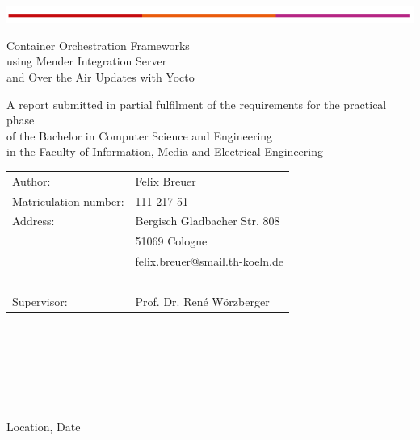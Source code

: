 \begin{titlepage}
\begin{flushleft}
	\vspace*{-1cm}
	\includegraphics[scale=1]{images/th-bar.png}\\
	\vspace*{1cm}
\end{flushleft}
\begin{center}
\begin{huge}
Container Orchestration Frameworks\\
using Mender Integration Server\\
and Over the Air Updates with Yocto\\
\end{huge}
\vspace{1cm}
A report submitted in partial fulfilment of the requirements for the practical phase \\of the Bachelor in Computer Science and Engineering \\in the Faculty of Information, Media and Electrical Engineering
\end{center}
\vspace{3cm}
\noindent\begin{tabular}{ll}
	Author: & Felix Breuer \\
	Matriculation number: &	111 217 51 \\
	Address: & Bergisch Gladbacher Str. 808 \\
	~ &	51069 Cologne \\
	~ &	felix.breuer@smail.th-koeln.de \\
	~ & ~ \\
	Supervisor: & Prof. Dr. René Wörzberger
\end{tabular}
~\\
~\\
~\\
~\\
~\\
~\\
Location, Date
\end{titlepage}
\newpage
